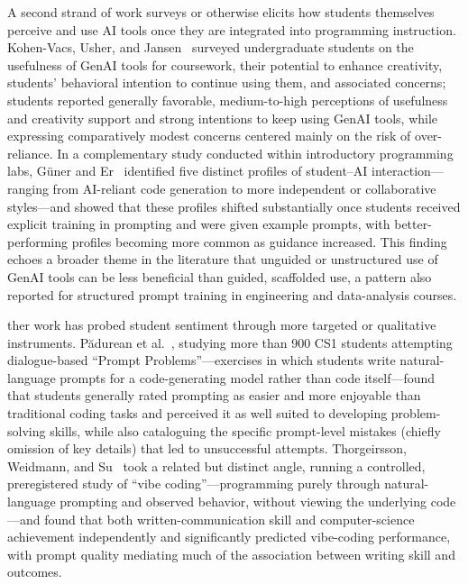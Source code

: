 \documentclass[sigconf]{acmart}
\begin{document}
A second strand of work surveys or otherwise elicits how students themselves
perceive and use AI tools once they are integrated into programming
instruction. Kohen-Vacs, Usher, and Jansen~\cite{kohenvacs2025integrating}
surveyed undergraduate students on the usefulness of GenAI tools for
coursework, their potential to enhance creativity, students' behavioral
intention to continue using them, and associated concerns; students reported
generally favorable, medium-to-high perceptions of usefulness and creativity
support and strong intentions to keep using GenAI tools, while expressing
comparatively modest concerns centered mainly on the risk of over-reliance. In
a complementary study conducted within introductory programming labs, G\"uner
and Er~\cite{guner2025classroom} identified five distinct profiles of
student--AI interaction---ranging from AI-reliant code generation to more
independent or collaborative styles---and showed that these profiles shifted
substantially once students received explicit training in prompting and were
given example prompts, with better-performing profiles becoming more common as
guidance increased. This finding echoes a broader theme in the literature that
unguided or unstructured use of GenAI tools can be less beneficial than guided,
scaffolded use, a pattern also reported for structured prompt training in
engineering and data-analysis courses.

ther work has probed student sentiment through more targeted or qualitative
instruments. P\u{a}durean et al.~\cite{padurean2026understanding}, studying
more than 900 CS1 students attempting dialogue-based ``Prompt
Problems''---exercises in which students write natural-language prompts for a
code-generating model rather than code itself---found that students generally
rated prompting as easier and more enjoyable than traditional coding tasks and
perceived it as well suited to developing problem-solving skills, while also
cataloguing the specific prompt-level mistakes (chiefly omission of key
details) that led to unsuccessful attempts. Thorgeirsson, Weidmann, and
Su~\cite{thorgeirsson2026computer} took a related but distinct angle, running
a controlled, preregistered study of ``vibe coding''---programming purely
through natural-language prompting and observed behavior, without viewing the
underlying code---and found that both written-communication skill and
computer-science achievement independently and significantly predicted
vibe-coding performance, with prompt quality mediating much of the association
between writing skill and outcomes.
\end{document}
